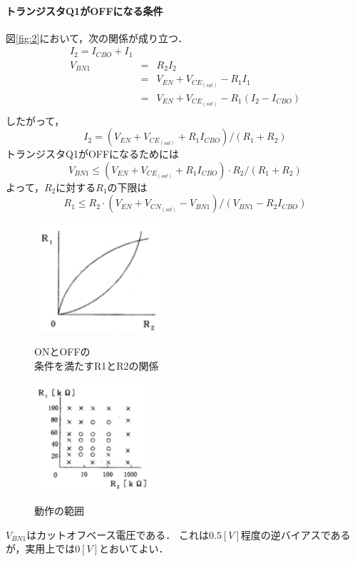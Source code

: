 \documentclass[10pt, a4j, dvipdfmx]{jarticle}
\begin{document}
    \paragraph{トランジスタQ1がOFFになる条件}
    図\ref{fig:2}において，次の関係が成り立つ．
    \begin{eqnarray}
        I_2 = I_{CBO} + I_1 \nonumber \\
        V_{BN1} & = & R_2 I_2 \nonumber \\
        & = & V_{EN} + V_{CE_{(sat)}} - R_1 I_1 \nonumber \\
        & = & V_{EN} + V_{CE_{(sat)}} - R_1 (I_2 - I_{CBO}) \nonumber \\
    \end{eqnarray}
    したがって，
    \[
        I_2 = (V_{EN} + V_{CE_{(sat)}} + R_1 I_{CBO}) / (R_1 + R_2)
    \]
    トランジスタQ1がOFFになるためには
    \[
        V_{BN1} \leq (V_{EN} + V_{CE_{(sat)}} + R_1 I_{CBO}) \cdot R_2 / (R_1 + R_2)
    \]
    よって，$R_2$に対する$R_1$の下限は
    \[
        R_1 \leq  R_2 \cdot (V_{EN} + V_{CN_{(sat)}} - V_{BN1}) / (V_{BN1} - R_2 I_{CBO})
    \]
    \newpage
    \begin{figure}
        \vspace*{-\intextsep}
        \begin{center}
        \includegraphics[height=40mm]{images/fig-7.png}
        \caption{ONとOFFの\\条件を満たすR1とR2の関係}
        \label{fig:7}
        \includegraphics[height=40mm]{images/fig-8.png}
        \caption{動作の範囲}
        \label{fig:8}
        \end{center}
    \end{figure}
    $V_{BN1}$はカットオフベース電圧である．
    これは$0.5[V]$程度の逆バイアスであるが，実用上では$0[V]$とおいてよい．
\end{document}
